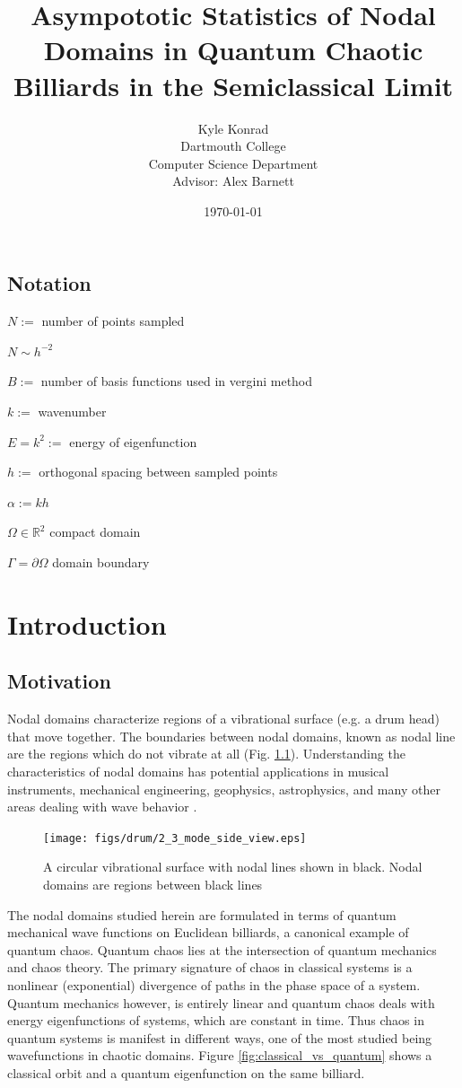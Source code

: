 \documentclass{report}
\begin{document}
\title{Asympototic Statistics of Nodal Domains in Quantum Chaotic Billiards in the Semiclassical Limit}
\author{Kyle Konrad\\
  Dartmouth College\\
  Computer Science Department\\
  Advisor: Alex Barnett}
\date{\today}


\section*{Notation}
$N :=$ number of points sampled

$N \sim h^{-2}$

$B :=$ number of basis functions used in vergini method

$k :=$ wavenumber

$E = k^{2} :=$ energy of eigenfunction

$h :=$ orthogonal spacing between sampled points

$\alpha := k h$

$\Omega \in \mathbb{R}^2$ compact domain

$\Gamma = \partial \Omega$ domain boundary

\chapter{Introduction}
\label{chap:intro}
\section{Motivation}
\label{sec:motivation}
Nodal domains characterize regions of a vibrational surface (e.g. a drum head) that move together. The boundaries between nodal domains, known as nodal line are the regions which do not vibrate at all (Fig. \ref{fig:drum}). Understanding the characteristics of nodal domains has potential applications in musical instruments, mechanical engineering, geophysics, astrophysics, and many other areas dealing with wave behavior \cite{wigman}.

\begin{figure}
  \begin{center}
    \texttt{[image: figs/drum/2\_3\_mode\_side\_view.eps]}
    \caption{A circular vibrational surface with nodal lines shown in black. Nodal domains are regions between black lines}
    \label{fig:drum}
  \end{center}
\end{figure}

The nodal domains studied herein are formulated in terms of quantum mechanical wave functions on Euclidean billiards, a canonical example of quantum chaos. Quantum chaos lies at the intersection of quantum mechanics and chaos theory. The primary signature of chaos in classical systems is a nonlinear (exponential) divergence of paths in the phase space of a system. Quantum mechanics however, is entirely linear and quantum chaos deals with energy eigenfunctions of systems, which are constant in time. Thus chaos in quantum systems is manifest in different ways, one of the most studied being wavefunctions in chaotic domains. Figure \ref{fig:classical_vs_quantum} shows a classical orbit and a quantum eigenfunction on the same billiard.
\end{document}
